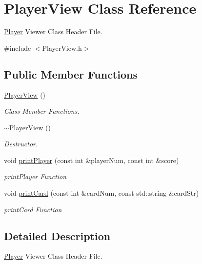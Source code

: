 \hypertarget{classPlayerView}{\section{Player\-View Class Reference}
\label{classPlayerView}
}


\hyperlink{classPlayer}{Player} Viewer Class Header File.  




{\ttfamily \#include $<$Player\-View.\-h$>$}

\subsection*{Public Member Functions}
\begin{DoxyCompactItemize}
\item 
\hyperlink{classPlayerView_ade41a5861a60299e6fe727a18c2423b6}{Player\-View} ()
\begin{DoxyCompactList}\small\item\em Class Member Functions. \end{DoxyCompactList}\item 
\hyperlink{classPlayerView_a95cb7fade4bd8f33b2ac20671048cc40}{$\sim$\-Player\-View} ()
\begin{DoxyCompactList}\small\item\em Destructor. \end{DoxyCompactList}\item 
void \hyperlink{classPlayerView_a4acbabf569697d8fa850136c09aede38}{print\-Player} (const int \&player\-Num, const int \&score)
\begin{DoxyCompactList}\small\item\em print\-Player Function \end{DoxyCompactList}\item 
void \hyperlink{classPlayerView_a6ad7caef41480bc41dc02d1f1cc3adda}{print\-Card} (const int \&card\-Num, const std\-::string \&card\-Str)
\begin{DoxyCompactList}\small\item\em print\-Card Function \end{DoxyCompactList}\end{DoxyCompactItemize}


\subsection{Detailed Description}
\hyperlink{classPlayer}{Player} Viewer Class Header File. 

